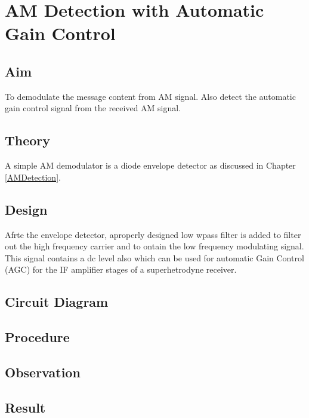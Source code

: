 \chapter[AM Detection with Automatic Gain Control]{AM Detection with Automatic Gain Control}
\section*{Aim}
To demodulate the message content from AM signal. Also detect the automatic gain control signal from the received AM signal.
\section*{Theory}
A simple AM demodulator is a diode envelope detector as discussed in  Chapter \ref{AMDetection}.
\section*{Design}Afrte the envelope detector, aproperly designed low wpass filter is added to filter out the high frequency carrier and to ontain the low frequency modulating signal. This signal contains a dc level also which can be used for automatic Gain Control (AGC) for the IF amplifier stages of a superhetrodyne receiver.
\section*{Circuit Diagram}
\section*{Procedure}
\section*{Observation}
\section*{Result}
